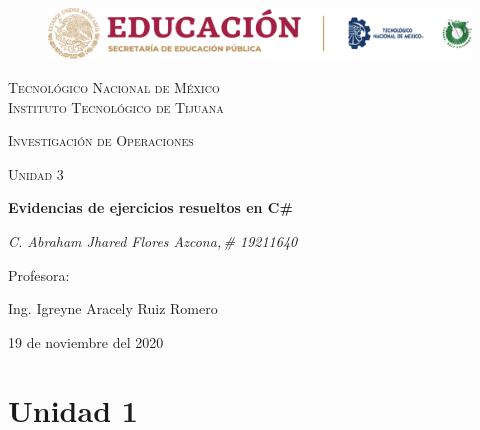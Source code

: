\documentclass[a4paper, 12pt]{article}
\begin{document}
    
    \begin{titlepage}
        \begin{figure}[ht]
            \centering
            \includegraphics[width=15cm]{logosITT.png}
        \end{figure}
        \centering
        {\scshape\LARGE Tecnológico Nacional de México\\Instituto Tecnológico de Tijuana\par}
        \vspace{1cm}
        {\scshape\Large Investigación de Operaciones\par}
        \vspace{1cm}
        {\scshape\Large Unidad 3\par}
        \vspace{1.5cm}
        {\huge\bfseries Evidencias de ejercicios resueltos en C\# \par}
        \vspace{2cm}
        {\Large\itshape C. Abraham Jhared Flores Azcona,\,\# 19211640\par}
        \vfill
        Profesora: \par
        Ing. Igreyne Aracely Ruiz Romero
        
        \vfill

        {\large 19 de noviembre del 2020}
    \end{titlepage}

    \newpage
    \thispagestyle{empty}
    \tableofcontents
    \listoffigures

    \newpage
    \section{Unidad 1}
\end{document}
